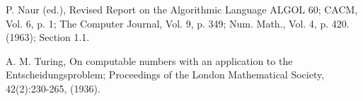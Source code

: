 \begin{thebibliography}{99}


P. Naur (ed.), Revised Report on the Algorithmic Language ALGOL 60; CACM, Vol.
6, p. 1; The Computer Journal, Vol. 9, p. 349; Num. Math., Vol. 4, p. 420.
(1963); Section 1.1.


A. M. Turing, On computable numbers with an application to the
Entscheidungsproblem; Proceedings of the London Mathematical Society,
42(2):230-265, (1936).

\end{thebibliography}
